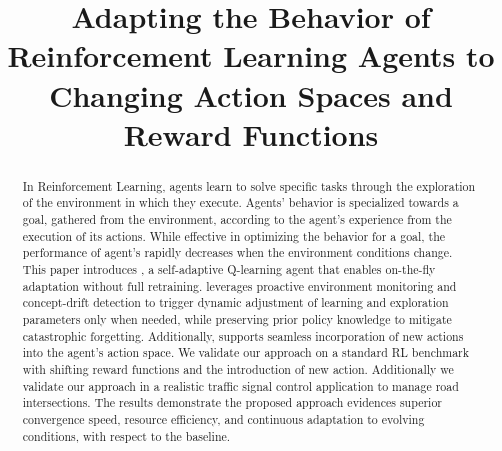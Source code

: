 \documentclass[10pt, conference, ]{IEEEtran}
\begin{document}
\title{Adapting the Behavior of Reinforcement Learning Agents to Changing Action Spaces and Reward Functions}

\author{
}

\maketitle




\begin{abstract}
In Reinforcement Learning, agents learn to solve specific tasks through the 
exploration of the environment in which they execute. Agents' behavior is
specialized towards a goal, gathered from the environment, according to the 
agent's experience from the execution of its actions. While effective in optimizing the behavior for a 
goal, the performance of agent's rapidly decreases when the environment conditions change.
This paper introduces \adaptiverl, a self-adaptive Q-learning agent that enables on-the-fly adaptation 
without full retraining. \adaptiverl leverages proactive environment monitoring and concept-drift 
detection to trigger dynamic adjustment of learning and exploration parameters only when needed, 
while preserving prior policy knowledge to mitigate catastrophic forgetting. Additionally, \adaptiverl 
supports seamless incorporation of new actions into the agent’s action space. We validate our approach 
on a standard RL benchmark with shifting reward functions and the introduction of new action. 
Additionally we validate our approach in a realistic traffic signal control application to manage road 
intersections. The results demonstrate the proposed approach evidences superior convergence 
speed, resource efficiency, and continuous adaptation to evolving conditions, with respect to the 
baseline.
\end{abstract}
\end{document}
